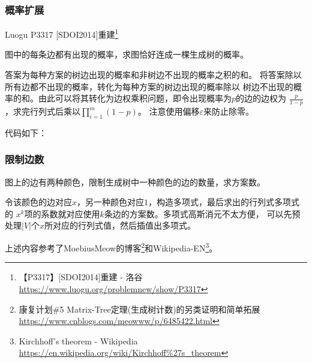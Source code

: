 \subsubsection{概率扩展}
Luogu P3317 [SDOI2014]重建\footnote{【P3317】[SDOI2014]重建 - 洛谷
\url{https://www.luogu.org/problemnew/show/P3317}
}

图中的每条边都有出现的概率，求图恰好连成一棵生成树的概率。

答案为每种方案的树边出现的概率和非树边不出现的概率之积的和。
将答案除以所有边都不出现的概率，转化为每种方案的树边出现的概率除以
树边不出现的概率的和。由此可以将其转化为边权乘积问题，即令出现概率为$p$的边的边权为
$\frac{p}{1-p}$，求完行列式后乘以$\displaystyle \prod_{i=1}^m{(1-p)}$。
注意使用偏移$\varepsilon$来防止除零。

代码如下：


\subsubsection{限制边数}
图上的边有两种颜色，限制生成树中一种颜色的边的数量，求方案数。

令该颜色的边对应$x$，另一种颜色对应$1$，构造多项式，最后求出的行列式多项式的
$x^k$项的系数就对应使用$k$条边的方案数。多项式高斯消元不太方便，
可以先预处理$|V|$个$x$所对应的行列式值，然后插值出多项式。

上述内容参考了MoebiusMeow的博客\footnote{
	康复计划\#5 Matrix-Tree定理(生成树计数)的另类证明和简单拓展
	\url{https://www.cnblogs.com/meowww/p/6485422.html}
}和Wikipedia-EN\footnote{
	Kirchhoff's theorem - Wikipedia\\
	\url{https://en.wikipedia.org/wiki/Kirchhoff\%27s\_theorem}
}。
